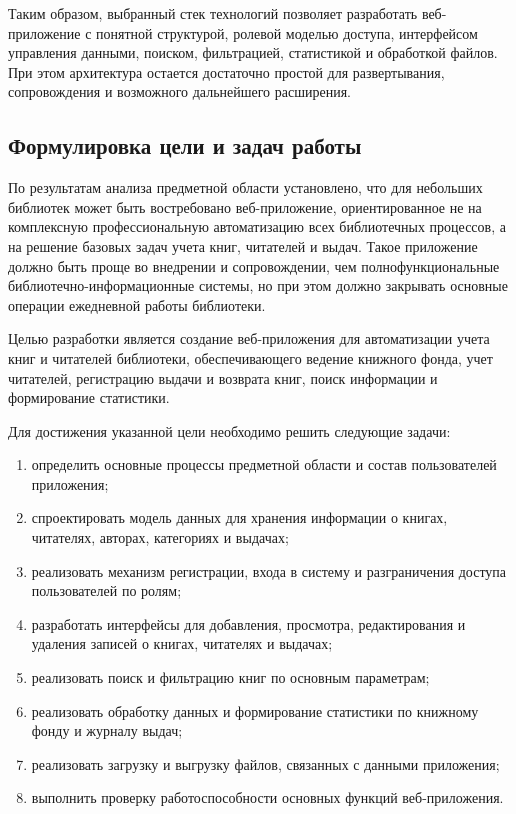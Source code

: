 Таким образом, выбранный стек технологий позволяет разработать веб-приложение
с понятной структурой, ролевой моделью доступа, интерфейсом управления данными,
поиском, фильтрацией, статистикой и обработкой файлов. При этом архитектура
остается достаточно простой для развертывания, сопровождения и возможного
дальнейшего расширения.

\subsection{Формулировка цели и задач работы}

По результатам анализа предметной области установлено, что для небольших библиотек
может быть востребовано веб-приложение, ориентированное не на комплексную
профессиональную автоматизацию всех библиотечных процессов, а на решение базовых
задач учета книг, читателей и выдач. Такое приложение должно быть проще во
внедрении и сопровождении, чем полнофункциональные библиотечно-информационные
системы, но при этом должно закрывать основные операции ежедневной работы
библиотеки.

Целью разработки является создание веб-приложения для автоматизации учета книг
и читателей библиотеки, обеспечивающего ведение книжного фонда, учет читателей,
регистрацию выдачи и возврата книг, поиск информации и формирование статистики.

Для достижения указанной цели необходимо решить следующие задачи:

\begin{enumerate}
    \item определить основные процессы предметной области и состав пользователей
    приложения;

    \item спроектировать модель данных для хранения информации о книгах,
    читателях, авторах, категориях и выдачах;

    \item реализовать механизм регистрации, входа в систему и разграничения
    доступа пользователей по ролям;

    \item разработать интерфейсы для добавления, просмотра, редактирования и
    удаления записей о книгах, читателях и выдачах;

    \item реализовать поиск и фильтрацию книг по основным параметрам;

    \item реализовать обработку данных и формирование статистики по книжному
    фонду и журналу выдач;

    \item реализовать загрузку и выгрузку файлов, связанных с данными приложения;

    \item выполнить проверку работоспособности основных функций веб-приложения.
\end{enumerate}

